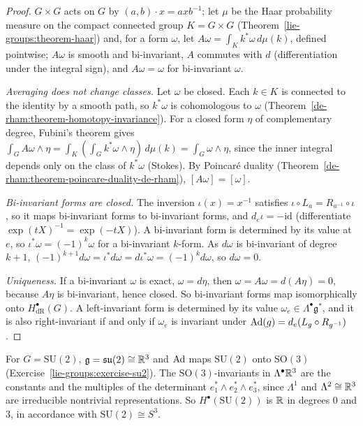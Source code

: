 \begin{proof}
$G \times G$ acts on $G$ by $(a, b) \cdot x = axb^{-1}$; let $\mu$ be the Haar probability measure on the compact connected group $K = G \times G$ (Theorem~\ref{lie-groups:theorem-haar}) and, for a form $\omega$, let
$A\omega = \int_Kk^*\omega\,d\mu(k)$, defined pointwise; $A\omega$ is smooth and bi-invariant, $A$ commutes with $d$ (differentiation under the integral sign), and $A\omega = \omega$ for bi-invariant $\omega$.

\emph{Averaging does not change classes.} Let $\omega$ be closed. Each $k \in K$ is connected to the identity by a smooth path, so $k^*\omega$ is cohomologous to $\omega$ (Theorem~\ref{de-rham:theorem-homotopy-invariance}). For a closed form $\eta$
of complementary degree, Fubini's theorem gives $\int_GA\omega \wedge \eta = \int_K(\int_Gk^*\omega \wedge \eta)\,d\mu(k) = \int_G\omega \wedge \eta$, since the inner integral depends only on the class of $k^*\omega$ (Stokes). By Poincar\'e duality
(Theorem~\ref{de-rham:theorem-poincare-duality-de-rham}), $[A\omega] = [\omega]$.

\emph{Bi-invariant forms are closed.} The inversion $\iota(x) = x^{-1}$ satisfies $\iota \circ L_a = R_{a^{-1}} \circ \iota$, so it maps bi-invariant forms to bi-invariant forms, and $d_e\iota = -\mathrm{id}$ (differentiate $\exp(tX)^{-1} = \exp(-tX)$).
A bi-invariant form is determined by its value at $e$, so $\iota^*\omega = (-1)^k\omega$ for a bi-invariant $k$-form. As $d\omega$ is bi-invariant of degree $k + 1$, $(-1)^{k+1}d\omega = \iota^*d\omega = d\iota^*\omega = (-1)^kd\omega$, so $d\omega = 0$.

\emph{Uniqueness.} If a bi-invariant $\omega$ is exact, $\omega = d\eta$, then $\omega = A\omega = d(A\eta) = 0$, because $A\eta$ is bi-invariant, hence closed. So bi-invariant forms map isomorphically onto $H^\bullet_{\mathrm{dR}}(G)$. A
left-invariant form is determined by its value $\omega_e \in \Lambda^\bullet\mathfrak{g}^*$, and it is also right-invariant if and only if $\omega_e$ is invariant under $\operatorname{Ad}(g) = d_e(L_g \circ R_{g^{-1}})$.
\end{proof}

\begin{example}\label{de-rham:example-su2}
For $G = \mathrm{SU}(2)$, $\mathfrak{g} = \mathfrak{su}(2) \cong \mathbb{R}^3$ and $\operatorname{Ad}$ maps $\mathrm{SU}(2)$ onto $\mathrm{SO}(3)$ (Exercise~\ref{lie-groups:exercise-su2}). The $\mathrm{SO}(3)$-invariants in $\Lambda^\bullet\mathbb{R}^3$ are the constants and the
multiples of the determinant $e_1^* \wedge e_2^* \wedge e_3^*$, since $\Lambda^1$ and $\Lambda^2 \cong \mathbb{R}^3$ are irreducible nontrivial representations. So $H^\bullet(\mathrm{SU}(2))$ is $\mathbb{R}$ in degrees $0$ and $3$, in accordance with
$\mathrm{SU}(2) \cong S^3$.
\end{example}

